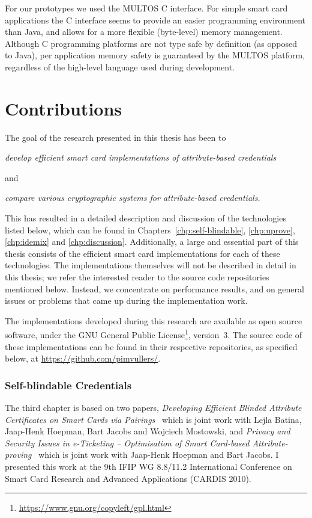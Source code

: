 For our prototypes we used the MULTOS C interface. For simple smart card
applications the C interface seems to provide an easier programming environment
than Java, and allows for a more flexible (byte-level) memory management.
Although C programming platforms are not type safe by definition (as opposed to
Java), per application memory safety is guaranteed by the MULTOS platform,
regardless of the high-level language used during development.


\section{Contributions}

The goal of the research presented in this thesis has been to
\begin{center}\it
  develop efficient smart card implementations of attribute-based credentials
\end{center}
and
\begin{center}\it
  compare various cryptographic systems for attribute-based credentials.
\end{center}
This has resulted in a detailed description and discussion of the technologies
listed below, which can be found in Chapters~\ref{chp:self-blindable},
\ref{chp:uprove}, \ref{chp:idemix} and \ref{chp:discussion}. Additionally, a
large and essential part of this thesis consists of the efficient smart card
implementations for each of these technologies. The implementations themselves
will not be described in detail in this thesis; we refer the interested reader
to the source code repositories mentioned below. Instead, we concentrate on
performance results, and on general issues or problems that came up during the
implementation work.

The implementations developed during this research are available as open source
software, under the GNU General Public
License\footnote{\url{https://www.gnu.org/copyleft/gpl.html}}, version~3. The
source code of these implementations can be found in their respective
repositories, as specified below, at \url{https://github.com/pimvullers/}.

\subsubsection{Self-blindable Credentials}

The third chapter is based on two papers, \emph{Developing Efficient Blinded
Attribute Certificates on Smart Cards via Pairings}~\cite{BatinaHJMV10} which
is joint work with Lejla Batina, Jaap-Henk Hoepman, Bart Jacobs and Wojciech
Mostowski, and \emph{Privacy and Security Issues in e-Ticketing -- Optimisation
of Smart Card-based Attribute-proving}~\cite{HoepmanJV10} which is joint work
with Jaap-Henk Hoepman and Bart Jacobs. I presented this work at the 9th IFIP WG
8.8/11.2 International Conference on Smart Card Research and Advanced
Applications (CARDIS 2010).

